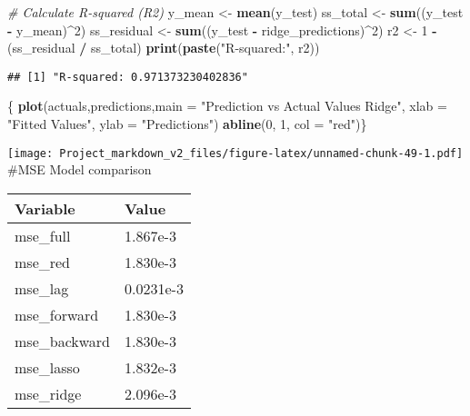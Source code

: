 \documentclass[
]{article}
\newenvironment{Shaded}{\begin{snugshade}}{\end{snugshade}}
\newcommand{\AttributeTok}[1]{\textcolor[rgb]{0.13,0.29,0.53}{#1}}
\newcommand{\CommentTok}[1]{\textcolor[rgb]{0.56,0.35,0.01}{\textit{#1}}}
\newcommand{\DecValTok}[1]{\textcolor[rgb]{0.00,0.00,0.81}{#1}}
\newcommand{\FunctionTok}[1]{\textcolor[rgb]{0.13,0.29,0.53}{\textbf{#1}}}
\newcommand{\NormalTok}[1]{#1}
\newcommand{\OtherTok}[1]{\textcolor[rgb]{0.56,0.35,0.01}{#1}}
\newcommand{\SpecialCharTok}[1]{\textcolor[rgb]{0.81,0.36,0.00}{\textbf{#1}}}
\newcommand{\StringTok}[1]{\textcolor[rgb]{0.31,0.60,0.02}{#1}}
\begin{document}
\begin{Shaded}
\begin{Highlighting}[]
\CommentTok{\# Calculate R{-}squared (R2)}
\NormalTok{y\_mean }\OtherTok{\textless{}{-}} \FunctionTok{mean}\NormalTok{(y\_test)}
\NormalTok{ss\_total }\OtherTok{\textless{}{-}} \FunctionTok{sum}\NormalTok{((y\_test }\SpecialCharTok{{-}}\NormalTok{ y\_mean)}\SpecialCharTok{\^{}}\DecValTok{2}\NormalTok{)}
\NormalTok{ss\_residual }\OtherTok{\textless{}{-}} \FunctionTok{sum}\NormalTok{((y\_test }\SpecialCharTok{{-}}\NormalTok{ ridge\_predictions)}\SpecialCharTok{\^{}}\DecValTok{2}\NormalTok{)}
\NormalTok{r2 }\OtherTok{\textless{}{-}} \DecValTok{1} \SpecialCharTok{{-}}\NormalTok{ (ss\_residual }\SpecialCharTok{/}\NormalTok{ ss\_total)}
\FunctionTok{print}\NormalTok{(}\FunctionTok{paste}\NormalTok{(}\StringTok{"R{-}squared:"}\NormalTok{, r2))}
\end{Highlighting}
\end{Shaded}

\begin{verbatim}
## [1] "R-squared: 0.971373230402836"
\end{verbatim}

\begin{Shaded}
\begin{Highlighting}[]
\NormalTok{\{}
\FunctionTok{plot}\NormalTok{(actuals,predictions,}\AttributeTok{main =} \StringTok{"Prediction vs Actual Values Ridge"}\NormalTok{,}
     \AttributeTok{xlab =} \StringTok{"Fitted Values"}\NormalTok{, }\AttributeTok{ylab =} \StringTok{"Predictions"}\NormalTok{)}
\FunctionTok{abline}\NormalTok{(}\DecValTok{0}\NormalTok{, }\DecValTok{1}\NormalTok{, }\AttributeTok{col =} \StringTok{"red"}\NormalTok{)\}}
\end{Highlighting}
\end{Shaded}

\texttt{[image: Project\_markdown\_v2\_files/figure-latex/unnamed-chunk-49-1.pdf]}
\#MSE Model comparison

\begin{longtable}[]{@{}ll@{}}
\toprule\noalign{}
Variable & Value \\
\midrule\noalign{}
\endhead
\bottomrule\noalign{}
\endlastfoot
mse\_full & 1.867e-3 \\
mse\_red & 1.830e-3 \\
mse\_lag & 0.0231e-3 \\
mse\_forward & 1.830e-3 \\
mse\_backward & 1.830e-3 \\
mse\_lasso & 1.832e-3 \\
mse\_ridge & 2.096e-3 \\
\end{longtable}
\end{document}

